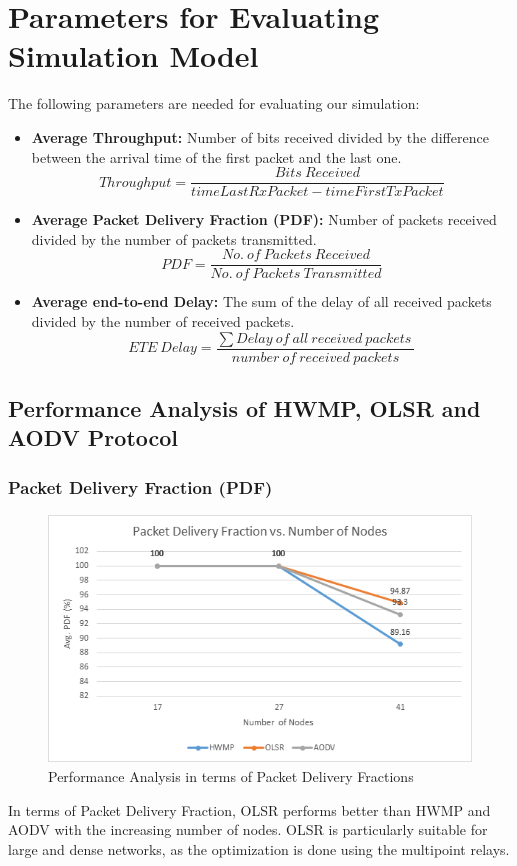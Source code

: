 \documentclass[12pt,a4paper]{report}
\begin{document}
\section{Parameters for Evaluating Simulation Model}
The following parameters are needed for evaluating our simulation:
\begin{itemize}


\item{\textbf{Average Throughput:}}
Number of bits received divided by the difference between the arrival time of the first packet and the last one.
$$Throughput = \frac{Bits\ Received}{timeLastRxPacket - timeFirstTxPacket} $$

\item{\textbf{Average Packet Delivery Fraction (PDF):}}
Number of packets received divided by the number of packets transmitted.
$$PDF = \frac{No.\ of\ Packets\ Received}{No.\ of\ Packets\ Transmitted}$$
\item{\textbf{Average end-to-end Delay:}}
The sum of the delay of all received packets divided by the number of received packets.
$$ETE\ Delay =  \frac{\sum\nolimits Delay\ of\ all\ received\ packets\ }{number\ of\ received\ packets}  $$
\end{itemize}

\newpage
\subsection{Performance Analysis of HWMP, OLSR and AODV Protocol}

\subsubsection{Packet Delivery Fraction (PDF)}

\begin{figure}[hbtp]
\centering
\includegraphics[scale=.7]{Graphs/PDF-vs-nodes.png}
\caption{Performance Analysis in terms of Packet Delivery Fractions}
\end{figure}
In terms of Packet Delivery Fraction, OLSR performs better than HWMP and AODV with the increasing number of nodes. OLSR is particularly suitable for large and dense networks, as the optimization is done using the multipoint relays.
\end{document}
